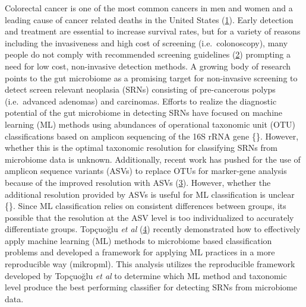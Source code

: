 \documentclass[
]{article}
\begin{document}
Colorectal cancer is one of the most common cancers in men and women and
a leading cause of cancer related deaths in the United States
(\protect\hyperlink{ref-siegel2020}{1}). Early detection and treatment
are essential to increase survival rates, but for a variety of reasons
including the invasiveness and high cost of screening
(i.e.~colonoscopy), many people do not comply with recommended screening
guidelines (\protect\hyperlink{ref-garcuxeda2011a}{2}) prompting a need
for low cost, non-invasive detection methods. A growing body of research
points to the gut microbiome as a promising target for non-invasive
screening to detect screen relevant neoplasia (SRNs) consisting of
pre-cancerous polyps (i.e.~advanced adenomas) and carcinomas. Efforts to
realize the diagnostic potential of the gut microbiome in detecting SRNs
have focused on machine learning (ML) methods using abundances of
operational taxonomic unit (OTU) classifications based on amplicon
sequencing of the 16S rRNA gene \{\}. However, whether this is the
optimal taxonomic resolution for classifying SRNs from microbiome data
is unknown. Additionally, recent work has pushed for the use of amplicon
sequence variants (ASVs) to replace OTUs for marker-gene analysis
because of the improved resolution with ASVs
(\protect\hyperlink{ref-callahan2017}{3}). However, whether the
additional resolution provided by ASVs is useful for ML classification
is unclear \{\}. Since ML classification relies on consistent
differences between groups, its possible that the resolution at the ASV
level is too individualized to accurately differentiate groups.
Topçuoğlu \emph{et al} (\protect\hyperlink{ref-topuxe7uolu2020}{4})
recently demonstrated how to effectively apply machine learning (ML)
methods to microbiome based classification problems and developed a
framework for applying ML practices in a more reproducible way
(mikropml). This analysis utilizes the reproducible framework developed
by Topçuoğlu \emph{et al} to determine which ML method and taxonomic
level produce the best performing classifier for detecting SRNs from
microbiome data.
\end{document}
